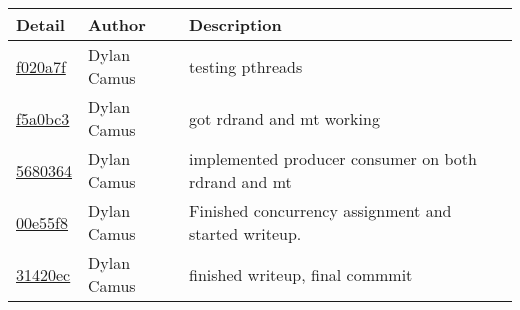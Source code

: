 \begin{tabular}{l l l}\textbf{Detail} & \textbf{Author} & \textbf{Description}\\\hline
\href{.//commit/f020a7f0bce34b3383b9ef6d66067182d8a6a256}{f020a7f} & Dylan Camus & testing pthreads\\\hline
\href{.//commit/f5a0bc3031aad89459e3913d5af8853293897cb9}{f5a0bc3} & Dylan Camus & got rdrand and mt working\\\hline
\href{.//commit/5680364e2af5ee2085f72cfb5e2037e82c213f8e}{5680364} & Dylan Camus & implemented producer consumer on both rdrand and mt\\\hline
\href{.//commit/00e55f8d6c88149d693cb1a7dbcaa7702e5e32bc}{00e55f8} & Dylan Camus & Finished concurrency assignment and started writeup.\\\hline
\href{.//commit/31420ecedbf0f6f5f6ff5578739f86c3c0c230c0}{31420ec} & Dylan Camus & finished writeup, final commmit\\\hline\end{tabular}

